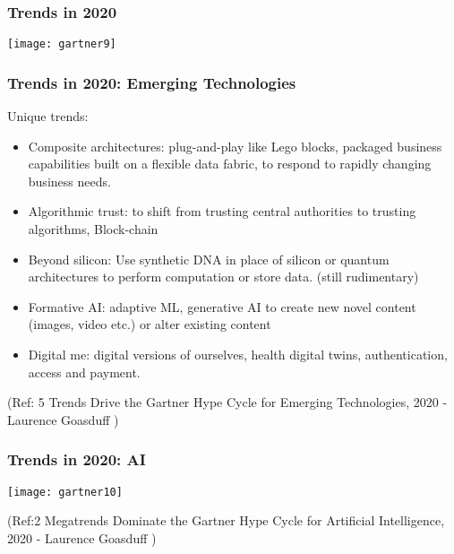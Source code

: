 \begin{frame}[fragile]\frametitle{Trends in 2020}

\begin{center}
\texttt{[image: gartner9]}
\end{center}


\end{frame}

\begin{frame}[fragile]\frametitle{Trends in 2020: Emerging Technologies}

Unique trends:

\begin{itemize}
\item Composite architectures: plug-and-play like Lego blocks, packaged business capabilities built on a flexible data fabric, to respond to rapidly changing business needs.
\item Algorithmic trust: to shift from trusting central authorities to trusting algorithms, Block-chain
\item Beyond silicon: Use synthetic DNA in place of silicon or quantum architectures to perform computation or store data. (still rudimentary)
\item Formative AI: adaptive ML, generative AI to create new novel content (images, video etc.) or alter existing content
\item Digital me: digital versions of ourselves, health digital twins, authentication, access and payment.
\end{itemize}


{\tiny (Ref: 5 Trends Drive the Gartner Hype Cycle for Emerging Technologies, 2020 - Laurence Goasduff )}

\end{frame}

\begin{frame}[fragile]\frametitle{Trends in 2020: AI}

\begin{center}
\texttt{[image: gartner10]}
\end{center}

{\tiny (Ref:2 Megatrends Dominate the Gartner Hype Cycle for Artificial Intelligence, 2020 - Laurence Goasduff )}

\end{frame}

